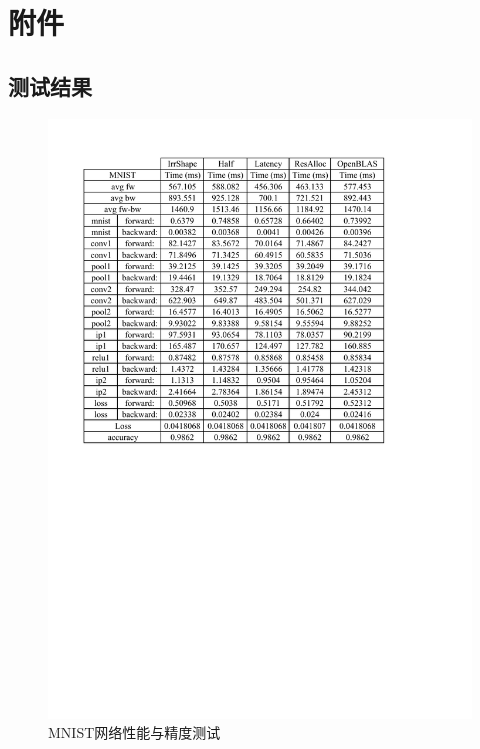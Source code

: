 
\chapter{附件}

\section{测试结果}
\begin{figure}[!ht]
	\centering	
	\includegraphics[width=\textwidth]{assets/imgs/mnist.pdf}
	\caption{MNIST网络性能与精度测试}
	\label{fig:mnist}
\end{figure}


